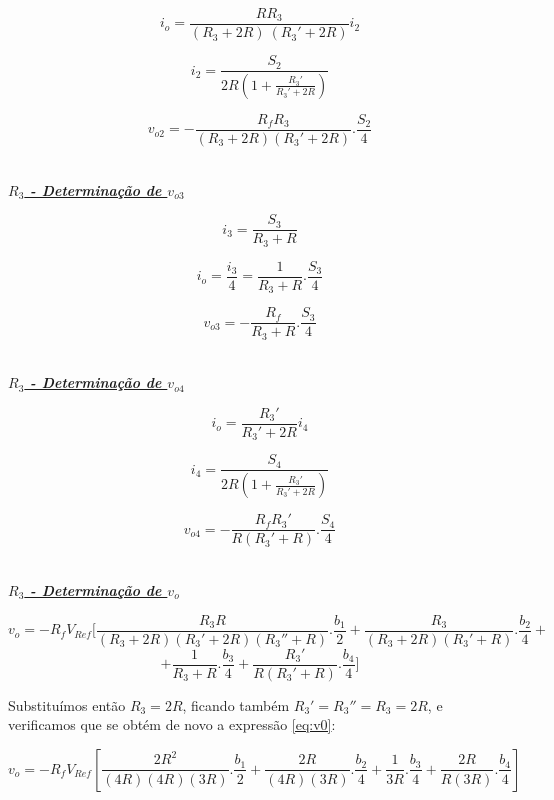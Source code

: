 \documentclass[a4paper,11pt]{report}
\begin{document}
$$i_o=\frac{RR_3}{\left(R_3+2R\right)~\left(R_3'+2R\right)}i_2$$

$$i_2=\frac{S_2}{2R\left(1+\frac{R_3'}{R_3'+2R}\right)}$$

$$v_{o2}=-\frac{R_fR_3}{\left(R_3+2R\right)\left(R_3'+2R\right)}.\frac{S_2}{4}$$\\

\par

\large\underline{\textit{\textbf{$R_3$ - Determinação de $v_{o3}$}}}\\
\par

$$i_3=\frac{S_3}{R_3+R}$$

$$i_o=\frac{i_3}{4}=\frac{1}{R_3+R}.\frac{S_3}{4}$$

$$v_{o3}=-\frac{R_f}{R_3+R}.\frac{S_3}{4}$$\\

\par

\large\underline{\textit{\textbf{$R_3$ - Determinação de $v_{o4}$}}}\\
\par

$$i_o=\frac{R_3'}{R_3'+2R}i_4$$

$$i_4=\frac{S_4}{2R\left(1+\frac{R_3'}{R_3'+2R}\right)}$$

$$v_{o4}=-\frac{R_fR_3'}{R\left(R_3'+R\right)}.\frac{S_4}{4}$$\\

\par

\large\underline{\textit{\textbf{$R_3$ - Determinação de $v_{o}$}}}\\
\par

$$v_o=-R_fV_{Ref}\Bigg[\frac{R_3R}{\left(R_3+2R\right)\left(R_3'+2R\right)\left(R_3''+R\right)}.\frac{b_1}{2}+\frac{R_3}{\left(R_3+2R\right)\left(R_3'+R\right)}.\frac{b_2}{4}+$$
\begin{equation}\label{eq:v0_3}
+\frac{1}{R_3+R}.\frac{b_3}{4}+\frac{R_3'}{R\left(R_3'+R\right)}.\frac{b_4}{4}\Bigg]
\end{equation}

Substituímos então $R_3=2R$, ficando também $R_3'=R_3''=R_3=2R$, e verificamos que se obtém de novo a expressão \ref{eq:v0}:

$$v_o=-R_fV_{Ref}\left[\frac{2R^2}{\left(4R\right)\left(4R\right)\left(3R\right)}.\frac{b_1}{2}+\frac{2R}{\left(4R\right)\left(3R\right)}.\frac{b_2}{4}+\frac{1}{3R}.\frac{b_3}{4}+\frac{2R}{R\left(3R\right)}.\frac{b_4}{4}\right]$$
\end{document}
